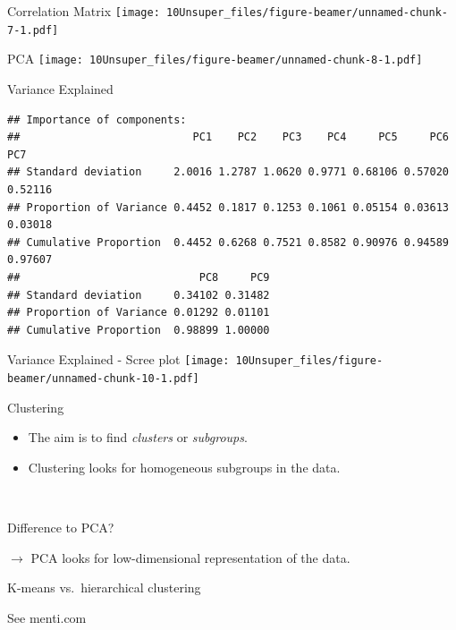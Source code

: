 \documentclass[
  10pt,
  ignorenonframetext,
]{beamer}
\begin{document}
\begin{frame}{Correlation Matrix}
\protect\hypertarget{correlation-matrix}{}
\texttt{[image: 10Unsuper\_files/figure-beamer/unnamed-chunk-7-1.pdf]}
\end{frame}

\begin{frame}{PCA}
\protect\hypertarget{pca}{}
\texttt{[image: 10Unsuper\_files/figure-beamer/unnamed-chunk-8-1.pdf]}
\end{frame}

\begin{frame}[fragile]{Variance Explained}
\protect\hypertarget{variance-explained}{}
\footnotesize

\begin{verbatim}
## Importance of components:
##                           PC1    PC2    PC3    PC4     PC5     PC6     PC7
## Standard deviation     2.0016 1.2787 1.0620 0.9771 0.68106 0.57020 0.52116
## Proportion of Variance 0.4452 0.1817 0.1253 0.1061 0.05154 0.03613 0.03018
## Cumulative Proportion  0.4452 0.6268 0.7521 0.8582 0.90976 0.94589 0.97607
##                            PC8     PC9
## Standard deviation     0.34102 0.31482
## Proportion of Variance 0.01292 0.01101
## Cumulative Proportion  0.98899 1.00000
\end{verbatim}
\end{frame}

\begin{frame}{Variance Explained - Scree plot}
\protect\hypertarget{variance-explained---scree-plot}{}
\texttt{[image: 10Unsuper\_files/figure-beamer/unnamed-chunk-10-1.pdf]}
\end{frame}

\begin{frame}{Clustering}
\protect\hypertarget{clustering}{}
\(~\)

\begin{itemize}
\item
  The aim is to find \emph{clusters} or \emph{subgroups}.
\item
  Clustering looks for homogeneous subgroups in the data.
\end{itemize}

\(~\)

Difference to PCA?

\pause

\(\rightarrow\) PCA looks for low-dimensional representation of the
data.
\end{frame}

\begin{frame}
\begin{block}{K-means vs.~hierarchical clustering}
\protect\hypertarget{k-means-vs.-hierarchical-clustering}{}
\(~\)

See menti.com
\end{block}
\end{frame}
\end{document}
